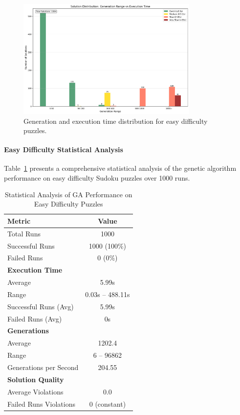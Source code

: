 \begin{figure}[H]
\centering
\includegraphics[width=0.8\textwidth]{resources/generation_execution_time_bars_easy.png}
\caption{Generation and execution time distribution for easy difficulty puzzles.}
\label{fig:generation_execution_time_bars_easy}
\end{figure}

\paragraph{Easy Difficulty Statistical Analysis}

Table~\ref{tab:easy_difficulty_stats} presents a comprehensive statistical analysis of the genetic algorithm performance on easy difficulty Sudoku puzzles over 1000 runs.

\begin{table}[H]
\centering
\caption{Statistical Analysis of GA Performance on Easy Difficulty Puzzles}
\label{tab:easy_difficulty_stats}
\begin{tabular}{@{}lc@{}}
\toprule
\textbf{Metric} & \textbf{Value} \\
\midrule
Total Runs & 1000 \\
Successful Runs & 1000 (100\%) \\
Failed Runs & 0 (0\%) \\
\midrule
\textbf{Execution Time} & \\
Average & 5.99s \\
Range & 0.03s -- 488.11s\\
Successful Runs (Avg) & 5.99s \\
Failed Runs (Avg) & 0s \\
\midrule
\textbf{Generations} & \\
Average & 1202.4 \\
Range & 6 -- 96862 \\
Generations per Second & 204.55 \\
\midrule
\textbf{Solution Quality} & \\
Average Violations & 0.0 \\
Failed Runs Violations & 0 (constant) \\
\bottomrule
\end{tabular}
\end{table}

